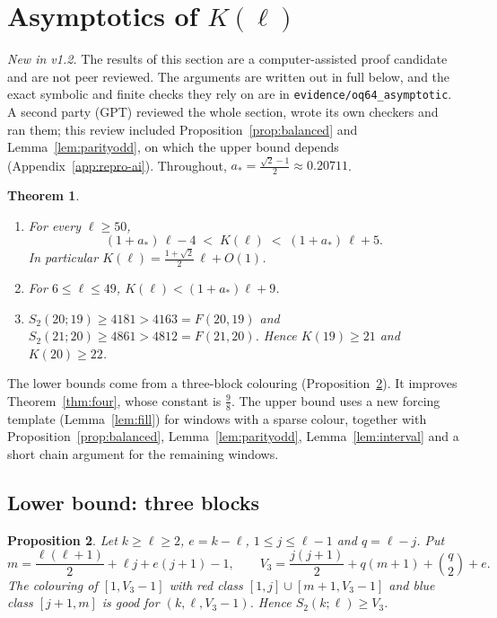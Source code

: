 \documentclass[11pt]{amsart}
\newtheorem{theorem}{Theorem}
\newtheorem{proposition}[theorem]{Proposition}
\theoremstyle{definition}
\newcommand{\F}{F}
\newcommand{\Stwo}{S_2}
\begin{document}
\section{Asymptotics of $K(\ell)$}\label{sec:asym}

\noindent\emph{New in v1.2.} The results of this section are a computer-assisted proof candidate and are not peer reviewed. The arguments are written out in full below, and the exact symbolic and finite checks they rely on are in \texttt{evidence/oq64\_asymptotic}. A second party (GPT) reviewed the whole section, wrote its own checkers and ran them; this review included Proposition~\ref{prop:balanced} and Lemma~\ref{lem:parityodd}, on which the upper bound depends (Appendix~\ref{app:repro-ai}). Throughout, $a_*=\frac{\sqrt2-1}{2}\approx0.20711$.

\begin{theorem}\label{thm:asym}
\begin{enumerate}[label=(\alph*)]
\item For every $\ell\ge50$,
\[
(1+a_*)\,\ell-4\;<\;K(\ell)\;<\;(1+a_*)\,\ell+5 .
\]
In particular $K(\ell)=\frac{1+\sqrt2}{2}\,\ell+O(1)$.
\item For $6\le\ell\le49$, $K(\ell)<(1+a_*)\ell+9$.
\item $\Stwo(20;19)\ge4181>4163=\F(20,19)$ and $\Stwo(21;20)\ge4861>4812=\F(21,20)$. Hence $K(19)\ge21$ and $K(20)\ge22$.
\end{enumerate}
\end{theorem}

\noindent The lower bounds come from a three-block colouring (Proposition~\ref{prop:three}). It improves Theorem~\ref{thm:four}, whose constant is $\frac98$. The upper bound uses a new forcing template (Lemma~\ref{lem:fill}) for windows with a sparse colour, together with Proposition~\ref{prop:balanced}, Lemma~\ref{lem:parityodd}, Lemma~\ref{lem:interval} and a short chain argument for the remaining windows.

\subsection*{Lower bound: three blocks}

\begin{proposition}\label{prop:three}
Let $k\ge\ell\ge2$, $e=k-\ell$, $1\le j\le\ell-1$ and $q=\ell-j$. Put
\[
m=\frac{\ell(\ell+1)}{2}+\ell j+e(j+1)-1,\qquad V_3=\frac{j(j+1)}{2}+q(m+1)+\binom q2+e .
\]
The colouring of $[1,V_3-1]$ with red class $[1,j]\cup[m+1,V_3-1]$ and blue class $[j+1,m]$ is good for $(k,\ell,V_3-1)$. Hence $\Stwo(k;\ell)\ge V_3$.
\end{proposition}
\end{document}
